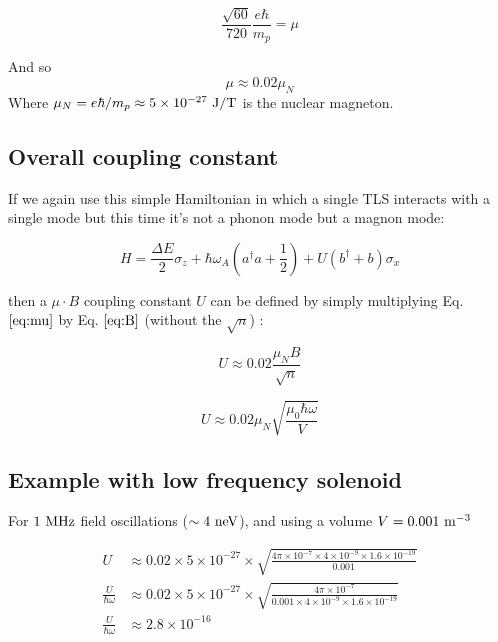 \documentclass[
]{article}
\renewcommand{\[}{\begin{equation}}
\renewcommand{\]}{\end{equation}}
\begin{document}
\[
\frac{\sqrt{60}}{720} \frac{e\hbar}{m_p} = \mu
\]

And so \[
\mu \approx 0.02 \mu_N
\label{eq:mu}
\] Where \(\mu_N = e\hbar/m_p \approx 5\times 10^{-27} \ \rm J/T\) is
the nuclear magneton.

\subsection{Overall coupling
constant}\label{overall-coupling-constant-2}

If we again use this simple Hamiltonian in which a single TLS interacts
with a single mode but this time it's not a phonon mode but a magnon
mode:

\[
H = \frac{\Delta E}{2} \sigma_z + \hbar\omega_A\left(a^{\dagger}a +\frac{1}{2}\right) + U\left( b^{\dagger} + b \right)\sigma_x
\]

then a \(\mu \cdot B\) coupling constant \(U\) can be defined by simply
multiplying Eq. \(\ref{eq:mu}\) by Eq. \(\ref{eq:B}\) (without the
\(\sqrt{n}\)) :

\[
U \approx 0.02 \frac{{\mu_N}B}{\sqrt{n}}
\]

\[
U \approx 0.02 {\mu_N}\sqrt{\frac{\mu_0\hbar\omega}{V}}
\]

\subsection{Example with low frequency
solenoid}\label{example-with-low-frequency-solenoid}

For \(1 \ \rm MHz\) field oscillations (\(\sim 4 \ \rm neV\)), and using
a volume \(V = 0.001 \ \rm m^{-3}\)

\[
\begin{aligned}
U &\approx 0.02 \times 5\times 10^{-27}\times \sqrt{\frac{4\pi\times 10^{-7}\times 4\times 10^{-9}\times 1.6\times 10^{-19}}{0.001}} \\
\frac{U}{\hbar\omega} &\approx 0.02 \times 5\times 10^{-27}\times\sqrt{\frac{4\pi\times 10^{-7} }{0.001 \times 4\times 10^{-9}\times 1.6\times 10^{-19}}} \\
\frac{U}{\hbar\omega} &\approx 2.8\times10^{-16}
\end{aligned}
\]

\printbibliography
\end{document}
